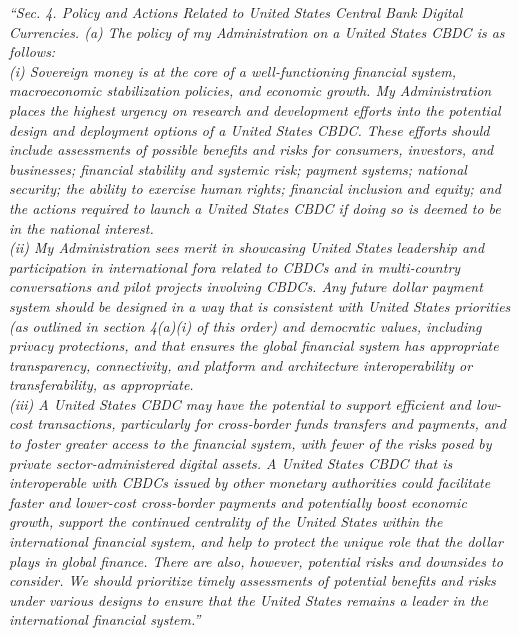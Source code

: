 \textit{``Sec. 4.  Policy and Actions Related to United States Central Bank Digital Currencies.  (a)  The policy of my Administration on a United States CBDC is as follows:\\
(i) Sovereign money is at the core of a well-functioning financial system, macroeconomic stabilization policies, and economic growth.  My Administration places the highest urgency on research and development efforts into the potential design and deployment options of a United States CBDC.  These efforts should include assessments of possible benefits and risks for consumers, investors, and businesses; financial stability and systemic risk; payment systems; national security; the ability to exercise human rights; financial inclusion and equity; and the actions required to launch a United States CBDC if doing so is deemed to be in the national interest.\\
(ii)   My Administration sees merit in showcasing United States leadership and participation in international fora related to CBDCs and in multi‑country conversations and pilot projects involving CBDCs.  Any future dollar payment system should be designed in a way that is consistent with United States priorities (as outlined in section 4(a)(i) of this order) and democratic values, including privacy protections, and that ensures the global financial system has appropriate transparency, connectivity, and platform and architecture interoperability or transferability, as appropriate.\\
(iii)  A United States CBDC may have the potential to support efficient and low-cost transactions, particularly for cross‑border funds transfers and payments, and to foster greater access to the financial system, with fewer of the risks posed by private sector-administered digital assets.  A United States CBDC that is interoperable with CBDCs issued by other monetary authorities could facilitate faster and lower-cost cross-border payments and potentially boost economic growth, support the continued centrality of the United States within the international financial system, and help to protect the unique role that the dollar plays in global finance.  There are also, however, potential risks and downsides to consider.  We should prioritize timely assessments of potential benefits and risks under various designs to ensure that the United States remains a leader in the international financial system.''}\par

